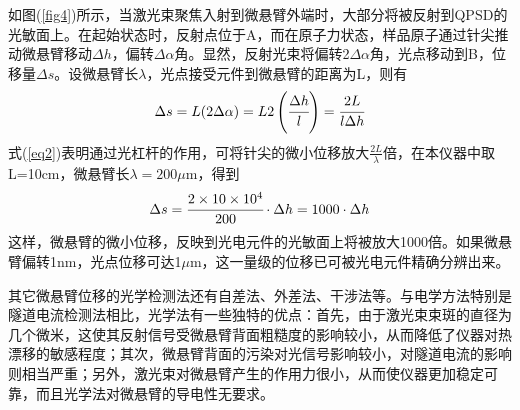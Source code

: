 \documentclass[a4paper]{article}
\begin{document}
如图(\ref{fig4})所示，当激光束聚焦入射到微悬臂外端时，大部分将被反射到QPSD的光敏面上。在起始状态时，反射点位于A，而在原子力状态，样品原子通过针尖推动微悬臂移动$\Delta h$，偏转$\Delta\alpha$角。显然，反射光束将偏转2$\Delta\alpha$角，光点移动到B，位移量$\Delta s$。设微悬臂长$\lambda$，光点接受元件到微悬臂的距离为L，则有
\begin{equation}
\Delta s = L(2\Delta\alpha) = L2\left(\cfrac{\Delta h}{l}\right) = \cfrac{2L}{l\Delta h}\label{eq2}
\end{equation}
式(\ref{eq2})表明通过光杠杆的作用，可将针尖的微小位移放大$\frac{2L}{\lambda}$倍，在本仪器中取L=10cm，微悬臂长$\lambda = \text{200}\mu$m，得到
\begin{equation}
\Delta s = \cfrac{2\times 10\times 10^4}{200}\cdot \Delta h = 1000\cdot \Delta h\label{eq3}
\end{equation}
这样，微悬臂的微小位移，反映到光电元件的光敏面上将被放大1000倍。如果微悬臂偏转1nm，光点位移可达1$\mu$m，这一量级的位移已可被光电元件精确分辨出来。

其它微悬臂位移的光学检测法还有自差法、外差法、干涉法等。与电学方法特别是隧道电流检测法相比，光学法有一些独特的优点：首先，由于激光束束斑的直径为几个微米，这使其反射信号受微悬臂背面粗糙度的影响较小，从而降低了仪器对热漂移的敏感程度；其次，微悬臂背面的污染对光信号影响较小，对隧道电流的影响则相当严重；另外，激光束对微悬臂产生的作用力很小，从而使仪器更加稳定可靠，而且光学法对微悬臂的导电性无要求。
\end{document}
